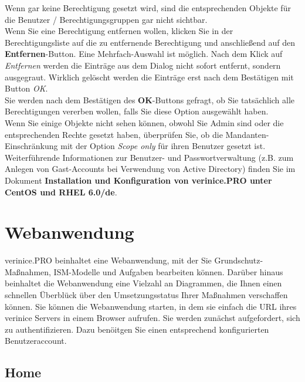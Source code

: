 \documentclass[a4paper,10pt]{book}
\begin{document}
Wenn gar keine Berechtigung gesetzt wird, sind die entsprechenden Objekte für die Benutzer / Berechtigungsgruppen gar nicht sichtbar.
\newline\\
Wenn Sie eine Berechtigung entfernen wollen, klicken Sie in der Berechtigungsliste auf die zu entfernende Berechtigung und anschließend auf den
\textbf{Entfernen}-Button. Eine Mehrfach-Auswahl ist möglich. Nach dem Klick auf \textit{Entfernen} werden die Einträge aus dem Dialog nicht sofort entfernt, sondern ausgegraut. Wirklich gelöscht werden die Einträge erst nach dem Bestätigen mit Button \textit{OK}.
\newline\\
Sie werden nach dem Bestätigen des \textbf{OK}-Buttons gefragt, ob Sie tatsächlich alle Berechtigungen vererben wollen, falls Sie diese Option
ausgewählt haben.
\newline\\
Wenn Sie einige Objekte nicht sehen können, obwohl Sie Admin sind oder die entsprechenden Rechte gesetzt haben, überprüfen Sie, ob die
Mandanten-Einschränkung mit der Option \textit{Scope only} für ihren Benutzer gesetzt ist.
\newline\\
Weiterführende Informationen zur Benutzer- und Passwortverwaltung (z.B. zum Anlegen von Gast-Accounts bei Verwendung von Active Directory)
finden Sie im Dokument \textbf{Installation und Konfiguration von verinice.\textsc{PRO} unter CentOS und RHEL 6.0/de}.


\section{Webanwendung}
\label{webanwendung}

verinice.PRO beinhaltet eine Webanwendung, mit der Sie Grundschutz-Maßnahmen,
ISM-Modelle und Aufgaben bearbeiten können. Darüber hinaus beinhaltet die
Webanwendung eine Vielzahl an Diagrammen, die Ihnen einen schnellen Überblück
über den Umsetzungsstatus Ihrer Maßnahmen verschaffen können. Sie können die
Webanwendung starten, in dem sie einfach die URL ihres verinice Servers in einem
Browser aufrufen. Sie werden zunächst aufgefordert, sich zu authentifizieren.
Dazu benöitgen Sie einen entsprechend konfigurierten Benutzeraccount.


\subsection{Home}
\end{document}

